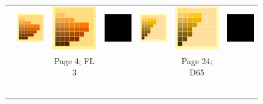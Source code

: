 \begin{figure}[t]
{\begin{tabular}{ccccccc}
			\\ \raisebox{0.5cm}[0pt][0pt]{\parbox[c][0pt][c]{0cm}{\hspace{-1.5em}\\[20pt]}\par}
			&
			\includegraphics[width=.155\linewidth]{img/results_uplift_page04_originalFL3.png}
			&
			\includegraphics[width=.155\linewidth]{img/results_uplift_page04_ourFL3.png}
			& 
			\includegraphics[width=.155\linewidth]{img/toDelete.png}
			&\quad
			\includegraphics[width=.155\linewidth]{img/results_uplift_page10_originalFL11.png}
			&
			\includegraphics[width=.155\linewidth]{img/results_uplift_page10_ourFL11.png}
			&
			\includegraphics[width=.155\linewidth]{img/toDelete.png}\\
			& & Page 4; FL 3 & & & Page 24; D65 & \\
			\vspace{0.1em} \\ 
			\raisebox{0.4cm}[0pt][0pt]{\parbox[c][0pt][c]{0cm}{\hspace{-1.5em}\\[20pt]}\par}

\end{tabular}}
\end{figure}
